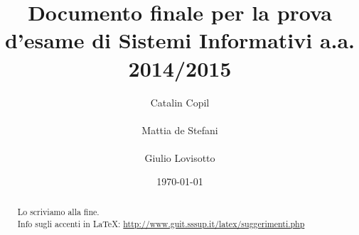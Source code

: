 \documentclass{llncs}
\begin{document}
\title{Documento finale per la prova d'esame di Sistemi Informativi
  a.a. 2014/2015} 
\author{
	Catalin Copil\\\\ 
	Mattia de Stefani\\\\ 
	Giulio Lovisotto\\} 
\institute{}

\date{\today}

\maketitle
\begin{abstract}
Lo scriviamo alla fine.\\
Info sugli accenti in \LaTeX : \underline{http://www.guit.sssup.it/latex/suggerimenti.php} 
	
	
\end{abstract}




\end{document}
